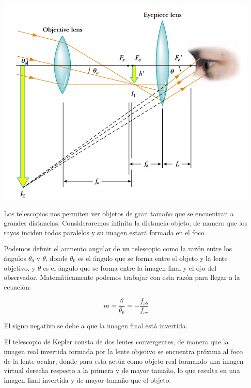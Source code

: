 \documentclass[a4paper,12pt]{article}
\newenvironment{Figure}
  {\par\medskip\noindent\minipage{\linewidth}}
  {\endminipage\par\medskip}
\begin{document}
\begin{multicols*}{2}
        \begin{Figure}
            \centering
            \includegraphics[width=0.8\linewidth]{telescopio.png}
            \label{fig: diagTelescopio}
        \end{Figure}

        Los telescopios nos permiten ver objetos de gran tamaño que se encuentran a grandes distancias. Consideraremos infinita la distancia objeto, de manera que los rayos inciden todos paralelos y su imagen estará formada en el foco. 

        Podemos definir el aumento angular de un telescopio como la razón entre los ángulos $\theta_{0}$ y $\theta$, donde $\theta_{0}$ es el ángulo que se forma entre el objeto y la lente objetivo, y $\theta$ es el ángulo que se forma entre la imagen final y el ojo del observador. Matemáticamente podemos trabajar con esta razón para llegar a la ecuación:

        \begin{equation} \label{eq: aumentoTel}
            m=\frac{\theta}{\theta_{0}}=-\frac{f_{ob}}{f_{oc}}
        \end{equation}

        El signo negativo se debe a que la imagen final está invertida.

        El telescopio de Kepler consta de dos lentes convergentes, de manera que la imagen real invertida formada por la lente objetivo se encuentra próxima al foco de la lente ocular, donde para esta actúa como objeto real formando una imagen virtual derecha respecto a la primera y de mayor tamaño, lo que resulta en una imagen final invertida y de mayor tamaño que el objeto.


\end{multicols*}
\end{document}
